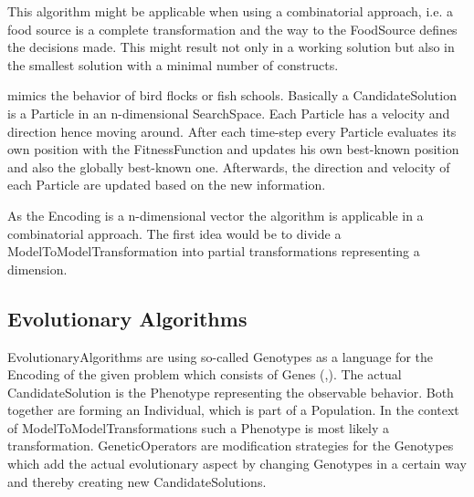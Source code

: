 This algorithm might be applicable when using a combinatorial approach, i.e. a food source is a complete transformation and the way to the \gls{FoodSource} defines the decisions made. This might result not only in a working solution but also in the smallest solution with a minimal number of constructs.

\textbf{} \cite{Kennedy1995} mimics the behavior of bird flocks or fish schools. Basically a \gls{CandidateSolution} is a \gls{Particle} in an n-dimensional \gls{SearchSpace}. Each \gls{Particle} has a velocity and direction hence moving around. After each time-step every \gls{Particle} evaluates its own position with the \gls{FitnessFunction} and updates his own best-known position and also the globally best-known one. Afterwards, the direction and velocity of each \gls{Particle} are updated based on the new information.

As the \gls{Encoding} is a n-dimensional vector the algorithm is applicable in a combinatorial approach. The first idea would be to divide a \gls{ModelToModelTransformation} into partial transformations representing a dimension.


\subsection{Evolutionary Algorithms}\label{secEvolutionaryAlgorithms}

\Glspl{EvolutionaryAlgorithm} are using so-called \glspl{Genotype} as a language for the \gls{Encoding} of the given problem which consists of \glspl{Gene} (\cite{holland75},\cite{Ashlock2004}). The actual \gls{CandidateSolution} is the \gls{Phenotype} representing the observable behavior. Both together are forming an \gls{Individual}, which is part of a \gls{Population}. In the context of \glspl{ModelToModelTransformation} such a \gls{Phenotype} is most likely a transformation. \Glspl{GeneticOperator} are modification strategies for the \glspl{Genotype} which add the actual evolutionary aspect by changing \glspl{Genotype} in a certain way and thereby creating new \glspl{CandidateSolution}. 

